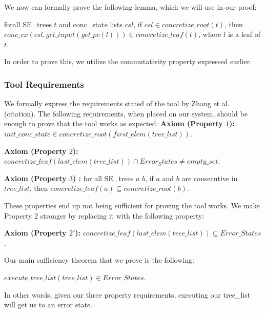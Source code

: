 We now can formally prove the following lemma, which we will use in our proof:
\begin{lemma} \label{cop}
forall SE\_trees $t$ and conc\_state lists $csl$,
if $csl \in concretize\_root(t)$,
then 
$conc\_ex(csl, get\_input (get\_pc (l))) \in concretize\_leaf(t)$,
where $l$ is a leaf of $t$.
\end{lemma}

In order to prove this, we utilize the commutativity property expressed earlier.


\subsubsection{Tool Requirements}
We formally express the requirements stated of the tool by Zhang et al. (citation).
The following requirements, when placed on our system, should be enough to prove that the tool works as expected:
\textbf{Axiom (Property $1$):} 
$init\_conc\_state \in concretize\_root(first\_elem (tree\_list))$.

\textbf{Axiom (Property $2$):}
$ concretize\_leaf (last\_elem (tree\_list)) \cap Error_States 
\neq empty\_set $.

\textbf{Axiom (Property $3$) :} 
for all SE\_trees $a$ $b$, 
if $a$ and $b$ are consecutive in $tree\_list$, then 
$concretize\_leaf (a) \subseteq
concretize\_root(b) $.

These properties end up not being sufficient for proving the tool works. 
We make Property 2 stronger by replacing it with the following property:

\textbf{Axiom (Property $2'$):}
$concretize\_leaf (last\_elem (tree\_list))
\subseteq Error\_States $.



Our main sufficiency theorem that we prove is the following:
\begin{theorem}
$execute\_tree\_list (tree\_list) \in Error\_States$.
\end{theorem}
 In other words, given our three property requirements, executing our tree\_list will get us to an error state.